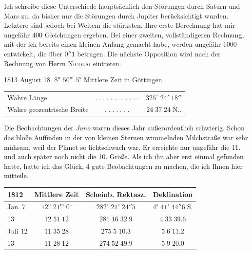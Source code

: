 \par\indent Ich schreibe diese Unterschiede hauptsächlich den Störungen durch Saturn und Mars zu, da bisher nur die Störungen durch Jupiter berücksichtigt wurden. Letztere sind jedoch bei Weitem die stärksten. Ihre erste Berechnung hat mir ungefähr 400 Gleichungen ergeben. Bei einer zweiten, vollständigeren Rechnung, mit der ich bereits einen kleinen Anfang gemacht habe, werden ungefähr 1000 entwickelt, die über $0''1$ betragen. Die nächste Opposition wird nach der Rechnung von Herrn \textsc{Nicolai} eintreten

1813 August 18. $8^{\mathrm u}\;50^{\mathrm m}\;5^{\mathrm s}$ Mittlere Zeit in Göttingen

\begin{center}\fontsize{10}{12}\selectfont\setlength{\tabcolsep}{2pt}\renewcommand{\arraystretch}{1.15}\begin{tabular}{lcr}
Wahre Länge & $.\;.\;.\;.\;.\;.\;.\;.\;.\;.\;.\;.$ & $325^\circ\;24'\;18''$\\
Wahre geozentrische Breite & $.\;.\;.\;.\;.\;.\;.$ & $24\;37\;24\;\mathrm{N}..$\\
\end{tabular}\end{center}

\par\indent Die Beobachtungen der \emph{Juno} waren dieses Jahr außerordentlich schwierig. Schon das bloße Auffinden in der von kleinen Sternen wimmelnden Milchstraße war sehr mühsam, weil der Planet so lichtschwach war. Er erreichte nur ungefähr die 11. und auch später noch nicht die 10. Größe. Als ich ihn aber erst einmal gefunden hatte, hatte ich das Glück, 4 gute Beobachtungen zu machen, die ich Ihnen hier mitteile.

\begin{center}\fontsize{10}{12}\selectfont\setlength{\tabcolsep}{4pt}\renewcommand{\arraystretch}{1.15}\begin{tabular}{l|c|c|c}
1812 & Mittlere Zeit & Scheinb. Rektasz. & Deklination\\\hline
Jan. 7 & $12^{\mathrm u}\;21^{\mathrm m}\;0^{\mathrm s}$ & $282^\circ\;21'\;24''5$ & $4^\circ\;41'\;44''6\;\mathrm S.$\\
13 & $12\;51\;12$ & $281\;16\;32.9$ & $4\;33\;39.6$\\
Juli 12 & $11\;35\;28$ & $275\;5\;10.3$ & $5\;6\;11.2$\\
13 & $11\;28\;12$ & $274\;52\;49.9$ & $5\;9\;20.0$\\
\end{tabular}\end{center}

